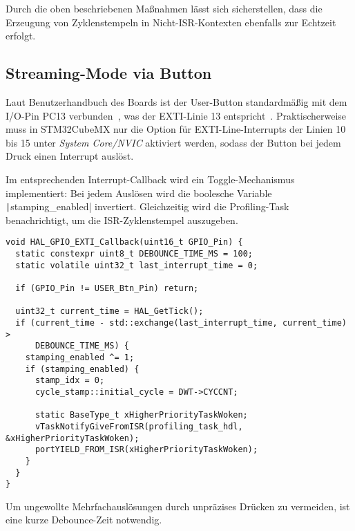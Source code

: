 
Durch die oben beschriebenen Maßnahmen lässt sich sicherstellen, dass die
Erzeugung von Zyklenstempeln in Nicht-ISR-Kontexten ebenfalls zur Echtzeit
erfolgt.

\subsection{Streaming-Mode via Button}

Laut Benutzerhandbuch des Boards ist der User-Button standardmäßig mit dem
I/O-Pin PC13 verbunden~\cite[S. 24, 6.6]{stm32_nucleo144_user_manual}, was der
EXTI-Linie 13 entspricht~\cite[S. 322, 11.8]{stm32f7_ref_manual}.
Praktischerweise muss in STM32CubeMX nur die Option für EXTI-Line-Interrupts der
Linien 10 bis 15 unter \textit{System Core/NVIC} aktiviert werden, sodass der
Button bei jedem Druck einen Interrupt auslöst.

Im entsprechenden Interrupt-Callback wird ein Toggle-Mechanismus implementiert:
Bei jedem Auslösen wird die boolesche Variable
\texttt|stamping_enabled| invertiert. Gleichzeitig wird die
Profiling-Task benachrichtigt, um die ISR-Zyklenstempel auszugeben.


\begin{code}
\begin{verbatim}
void HAL_GPIO_EXTI_Callback(uint16_t GPIO_Pin) {
  static constexpr uint8_t DEBOUNCE_TIME_MS = 100;
  static volatile uint32_t last_interrupt_time = 0;

  if (GPIO_Pin != USER_Btn_Pin) return;

  uint32_t current_time = HAL_GetTick();
  if (current_time - std::exchange(last_interrupt_time, current_time) >
      DEBOUNCE_TIME_MS) {
    stamping_enabled ^= 1;
    if (stamping_enabled) {
      stamp_idx = 0;
      cycle_stamp::initial_cycle = DWT->CYCCNT;

      static BaseType_t xHigherPriorityTaskWoken;
      vTaskNotifyGiveFromISR(profiling_task_hdl, &xHigherPriorityTaskWoken);
      portYIELD_FROM_ISR(xHigherPriorityTaskWoken);
    }
  }
}
\end{verbatim}
\end{code}

Um ungewollte Mehrfachauslösungen durch unpräzises Drücken zu vermeiden, ist
eine kurze Debounce-Zeit notwendig.


